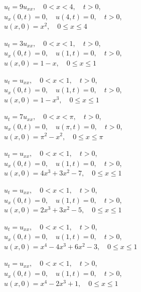 \begin{exerciselist}
  \item\label{exer:12.1.35} $u_{t}=9u_{xx},\quad0<x<4,\quad t>0$,\\ $u_{x}(0,t)=0,\quad u(4,t)=0,\quad t>0$,\\ $u(x,0)=x^{2},\quad0\le x\le4$

  \item\label{exer:12.1.36} \Cex $u_{t}=3u_{xx},\quad0<x<1,\quad t>0$,\\ $u_{x}(0,t)=0,\quad u(1,t)=0,\quad t>0$,\\ $u(x,0)=1-x,\quad0\le x\le1$

  \item\label{exer:12.1.37} $u_{t}=u_{xx},\quad0<x<1,\quad t>0$,\\ $u_{x}(0,t)=0,\quad u(1,t)=0,\quad t>0$,\\ $u(x,0)=1-x^{3},\quad0\le x\le1$

  \item\label{exer:12.1.38} $u_{t}=7u_{xx},\quad0<x<\pi,\quad t>0$,\\ $u_{x}(0,t)=0,\quad u(\pi,t)=0,\quad t>0$,\\ $u(x,0)=\pi^{2}-x^{2},\quad0\le x\le\pi$

  \item\label{exer:12.1.39} $u_{t}=u_{xx},\quad0<x<1,\quad t>0$,\\ $u_{x}(0,t)=0,\quad u(1,t)=0,\quad t>0$,\\ $u(x,0)=4x^{3}+3x^{2}-7,\quad0\le x\le1$

  \item\label{exer:12.1.40} $u_{t}=u_{xx},\quad0<x<1,\quad t>0$,\\ $u_{x}(0,t)=0,\quad u(1,t)=0,\quad t>0$,\\ $u(x,0)=2x^{3}+3x^{2}-5,\quad0\le x\le1$

  \item\label{exer:12.1.41} \Cex $u_{t}=u_{xx},\quad0<x<1,\quad t>0$,\\ $u_{x}(0,t)=0,\quad u(1,t)=0,\quad t>0$,\\ $u(x,0)=x^{4}-4x^{3}+6x^{2}-3,\quad0\le x\le1$

  \item\label{exer:12.1.42} $u_{t}=u_{xx},\quad0<x<1,\quad t>0$,\\ $u_{x}(0,t)=0,\quad u(1,t)=0,\quad t>0$,\\ $u(x,0)=x^{4}-2x^{3}+1,\quad0\le x\le1$



\end{exerciselist}
